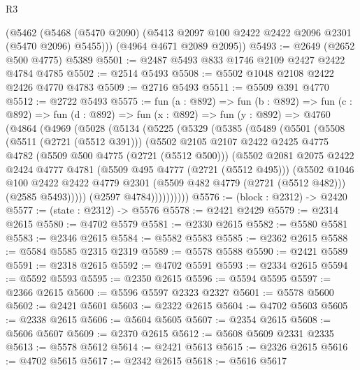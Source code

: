 \begin{lexlean}{R3}
\begin{coremodule}
      (@5462 (@5468 (@5470 @2090) (@5413 @2097 @100 @2422 @2422 @2096 @2301 (@5470 @2096) @5455)))
      (@4964 @4671 @2089 @2095))
@5493 := @2649 (@2652 @500 @4775) @5389
@5501 := @2487 @5493 @833 @1746 @2109 @2427 @2422 @4784 @4785
@5502 := @2514 @5493
@5508 := @5502 @1048 @2108 @2422 @2426 @4770 @4783
@5509 := @2716 @5493
@5511 := @5509 @391 @4770
@5512 := @2722 @5493
@5575 := fun (a : @892) =>
  fun (b : @892) =>
  fun (c : @892) =>
  fun (d : @892) =>
  fun (x : @892) =>
  fun (y : @892) =>
  @4760
    (@4864
      (@4969
        (@5028
          (@5134
            (@5225
              (@5329
                (@5385
                  (@5489
                    (@5501
                      (@5508
                        (@5511 (@2721 (@5512 @391)))
                        (@5502
                          @2105
                          @2107
                          @2422
                          @2425
                          @4775
                          @4782
                          (@5509 @500 @4775 (@2721 (@5512 @500)))
                          (@5502
                            @2081
                            @2075
                            @2422
                            @2424
                            @4777
                            @4781
                            (@5509 @495 @4777 (@2721 (@5512 @495)))
                            (@5502
                              @1046
                              @100
                              @2422
                              @2422
                              @4779
                              @2301
                              (@5509 @482 @4779 (@2721 (@5512 @482)))
                              (@2585 @5493)))))
                      (@2597 @4784))))))))))
@5576 := (block : @2312) -> @2420
@5577 := (state : @2312) -> @5576
@5578 := @2421 @2429
@5579 := @2314 @2615
@5580 := @4702 @5579
@5581 := @2330 @2615
@5582 := @5580 @5581
@5583 := @2346 @2615
@5584 := @5582 @5583
@5585 := @2362 @2615
@5588 := @5584 @5585 @2315 @2319
@5589 := @5578 @5588
@5590 := @2421 @5589
@5591 := @2318 @2615
@5592 := @4702 @5591
@5593 := @2334 @2615
@5594 := @5592 @5593
@5595 := @2350 @2615
@5596 := @5594 @5595
@5597 := @2366 @2615
@5600 := @5596 @5597 @2323 @2327
@5601 := @5578 @5600
@5602 := @2421 @5601
@5603 := @2322 @2615
@5604 := @4702 @5603
@5605 := @2338 @2615
@5606 := @5604 @5605
@5607 := @2354 @2615
@5608 := @5606 @5607
@5609 := @2370 @2615
@5612 := @5608 @5609 @2331 @2335
@5613 := @5578 @5612
@5614 := @2421 @5613
@5615 := @2326 @2615
@5616 := @4702 @5615
@5617 := @2342 @2615
@5618 := @5616 @5617

\end{coremodule}
\end{lexlean}
